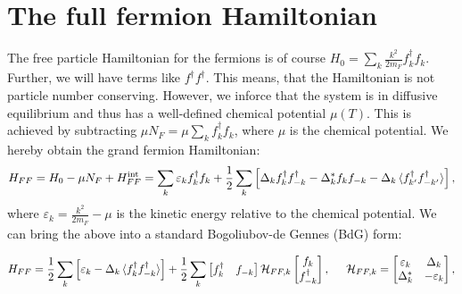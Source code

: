 \section{The full fermion Hamiltonian} \label{sec.HFFfull}
The free particle Hamiltonian for the fermions is of course $H_0 = \sum_k \frac{k^2}{2m_F} f^\dagger_k f_k$. Further, we will have terms like $f^\dagger f^\dagger$. This means, that the Hamiltonian is not particle number conserving. However, we inforce that the system is in diffusive equilibrium and thus has a well-defined chemical potential $\mu(T)$. This is achieved by subtracting $\mu N_F = \mu \sum_k f^\dagger_k f_k$, where $\mu$ is the chemical potential. We hereby obtain the grand fermion Hamiltonian:
\begin{equation}
H_{FF} = H_0-\mu N_F + H^\text{int}_{FF} = \sum_k \varepsilon_k f^\dagger_k f_k + \frac{1}{2}\sum_{k} \left[ \Delta_k f^\dagger_k f^\dagger_{-k} - \Delta^*_k f_k f_{-k} - \Delta_k \braket {f^\dagger_{k'}f^\dagger_{-k'}} \right], 
\label{eq.HFFdef}
\end{equation} 
where $\varepsilon_k = \frac{k^2}{2m_F}-\mu$ is the kinetic energy relative to the chemical potential. We can bring the above into a standard Bogoliubov-de Gennes (BdG) form:

\begin{equation}
H_{FF} = \frac{1}{2}\sum_k \left[\varepsilon_k - \Delta_k \braket {f^\dagger_k f^\dagger_{-k}}\right] + \frac{1}{2}\sum_{k} \begin{bmatrix} f_k^\dagger & f_{-k} \end{bmatrix} \mathcal{H}_{FF,k} \begin{bmatrix} f_k \\ f^\dagger_{-k} \end{bmatrix}, \hspace{0.5cm} \mathcal{H}_{FF,k} = \begin{bmatrix} \varepsilon_k & \Delta_k \\ \Delta^*_k & -\varepsilon_k \end{bmatrix}, 
\end{equation}

